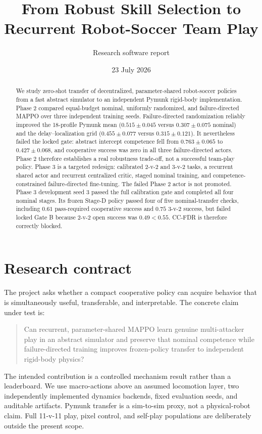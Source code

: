\documentclass[12pt,twocolumn]{article}
\title{\vspace{-1.2em}From Robust Skill Selection to Recurrent Robot-Soccer Team Play}
\author{Research software report}
\date{23 July 2026}
\begin{document}
\maketitle

\begin{abstract}
We study zero-shot transfer of decentralized, parameter-shared robot-soccer policies from a fast
abstract simulator to an independent Pymunk rigid-body implementation. Phase 2 compared
equal-budget nominal, uniformly randomized, and failure-directed MAPPO over three independent
training seeds. Failure-directed randomization reliably improved the 18-profile Pymunk mean
($0.515\pm0.045$ versus $0.307\pm0.075$ nominal) and the delay--localization grid
($0.455\pm0.077$ versus $0.315\pm0.121$). It nevertheless failed the locked gate: abstract
intercept competence fell from $0.763\pm0.065$ to $0.427\pm0.068$, and cooperative success was
zero in all three failure-directed actors. Phase 2 therefore establishes a real robustness
trade-off, not a successful team-play policy. Phase 3 is a targeted redesign: calibrated 2-v-2
and 3-v-2 tasks, a recurrent shared actor and recurrent centralized critic, staged nominal
training, and competence-constrained failure-directed fine-tuning. The failed Phase 2 actor is
not promoted. Phase 3 development seed 3 passed the full calibration gate and completed all four
nominal stages. Its frozen Stage-D policy passed four of five nominal-transfer checks, including
$0.61$ pass-required cooperative success and $0.75$ 3-v-2 success, but failed locked Gate B
because 2-v-2 open success was $0.49<0.55$. CC-FDR is therefore correctly blocked.
\end{abstract}

\section{Research contract}
The project asks whether a compact cooperative policy can acquire behavior that is simultaneously
useful, transferable, and interpretable. The concrete claim under test is:
\begin{quote}
Can recurrent, parameter-shared MAPPO learn genuine multi-attacker play in an abstract simulator
and preserve that nominal competence while failure-directed training improves frozen-policy
transfer to independent rigid-body physics?
\end{quote}
The intended contribution is a controlled mechanism result rather than a leaderboard. We use
macro-actions above an assumed locomotion layer, two independently implemented dynamics backends,
fixed evaluation seeds, and auditable artifacts. Pymunk transfer is a sim-to-sim proxy, not a
physical-robot claim. Full 11-v-11 play, pixel control, and self-play populations are deliberately
outside the present scope.
\end{document}
